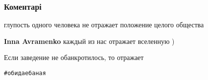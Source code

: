  
 
 
 
 
\subsubsection{Коментарі}
\label{sec:09_08_2021.fb.uljanov_anatolij.1.dnr_flag_lvov.cmt}

\begin{itemize}
 
глупость одного человека не отражает положение целого общества
\begin{itemize}
 
\textbf{Inna Avramenko} каждый из нас отражает вселенную )

 
Если заведение не обанкротилось, то отражает
\end{itemize}

 
\verb|#обидаебаная|

 

\end{itemize}
